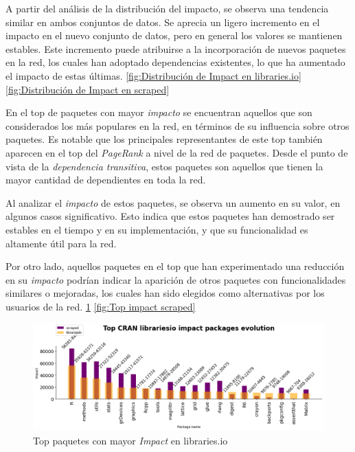 A partir del análisis de la distribución del impacto, se observa una tendencia similar en ambos
conjuntos de datos. Se aprecia un ligero incremento en el impacto en el nuevo conjunto de datos,
pero en general los valores se mantienen estables. Este incremento puede atribuirse a la incorporación
de nuevos paquetes en la red, los cuales han adoptado dependencias existentes, lo que ha aumentado el
impacto de estas últimas. \ref{fig:Distribución de Impact en libraries.io} \ref{fig:Distribución de Impact en scraped}


En el top de paquetes con mayor \textit{impacto} se encuentran aquellos que son considerados los más populares
en la red, en términos de su influencia sobre otros paquetes. Es notable que los principales representantes
de este top también aparecen en el top del \textit{PageRank} a nivel de la red de paquetes. Desde el punto
de vista de la \textit{dependencia transitiva}, estos paquetes son aquellos que tienen la mayor cantidad de
dependientes en toda la red.

Al analizar el \textit{impacto} de estos paquetes, se observa un aumento en su valor, en algunos casos
significativo. Esto indica que estos paquetes han demostrado ser estables en el tiempo y en su implementación,
y que su funcionalidad es altamente útil para la red.

Por otro lado, aquellos paquetes en el top que han experimentado una reducción en su \textit{impacto}
podrían indicar la aparición de otros paquetes con funcionalidades similares o mejoradas, los cuales han
sido elegidos como alternativas por los usuarios de la red. \ref{fig:Top impact libraries.io} \ref{fig:Top impact scraped}


\begin{figure}[h!]
    \begin{center}
        \includegraphics[width=1\textwidth]{img/cran/impact_top_libio.png}
        \caption{Top paquetes con mayor \textit{Impact} en libraries.io}
        \label{fig:Top impact libraries.io}
    \end{center}
\end{figure}

